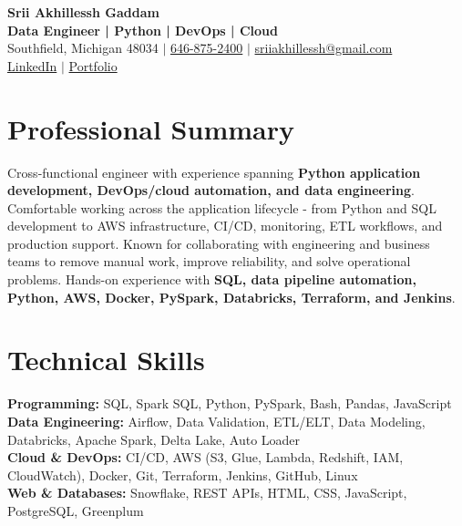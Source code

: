 \documentclass[letterpaper,10pt]{article}
\begin{document}
\fontsize{9.35pt}{10.45pt}\selectfont

\begin{center}
    {\LARGE \textbf{Srii Akhillessh Gaddam}} \\[-1pt]
    \textbf{Data Engineer | Python | DevOps | Cloud} \\[2pt]
    Southfield, Michigan 48034 $|$
    \href{tel:6468752400}{646-875-2400} $|$
    \href{mailto:sriiakhillessh@gmail.com}{sriiakhillessh@gmail.com} \\[1pt]
    \href{https://www.linkedin.com/in/srii-akhiilessh-gaddam-b48668191/}{LinkedIn} $|$
    \href{https://sriiakhillesshg.github.io/portfolio/}{Portfolio}
\end{center}
\vspace{-8pt}

\section{Professional Summary}
\small{Cross-functional engineer with experience spanning \textbf{Python application development, DevOps/cloud automation, and data engineering}. Comfortable working across the application lifecycle - from Python and SQL development to AWS infrastructure, CI/CD, monitoring, ETL workflows, and production support. Known for collaborating with engineering and business teams to remove manual work, improve reliability, and solve operational problems. Hands-on experience with \textbf{SQL, data pipeline automation, Python, AWS, Docker, PySpark, Databricks, Terraform, and Jenkins}.}

\section{Technical Skills}
\small{
\textbf{Programming:} SQL, Spark SQL, Python, PySpark, Bash, Pandas, JavaScript \\
\textbf{Data Engineering:} Airflow, Data Validation, ETL/ELT, Data Modeling, Databricks, Apache Spark, Delta Lake, Auto Loader \\
\textbf{Cloud \& DevOps:} CI/CD, AWS (S3, Glue, Lambda, Redshift, IAM, CloudWatch), Docker, Git, Terraform, Jenkins, GitHub, Linux \\
\textbf{Web \& Databases:} Snowflake, REST APIs, HTML, CSS, JavaScript, PostgreSQL, Greenplum
}

\end{document}
